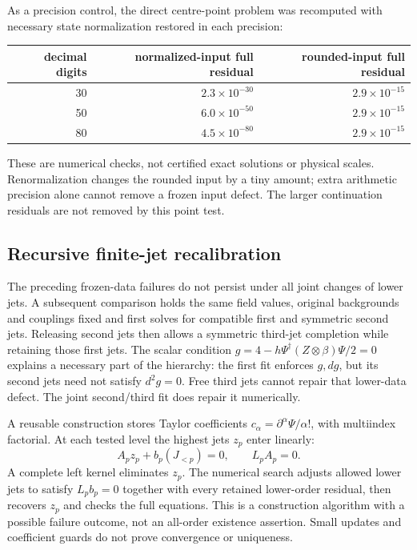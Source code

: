 As a precision control, the direct centre-point problem was recomputed
with necessary state normalization restored in each precision:
\begin{center}
\begin{tabular}{@{}rrr@{}}\toprule
decimal digits & normalized-input full residual & rounded-input full residual\\
\midrule
30 & \(2.3\times10^{-30}\) & \(2.9\times10^{-15}\)\\
50 & \(6.0\times10^{-50}\) & \(2.9\times10^{-15}\)\\
80 & \(4.5\times10^{-80}\) & \(2.9\times10^{-15}\)\\
\bottomrule\end{tabular}
\end{center}
These are numerical checks, not certified exact solutions or physical
scales. Renormalization changes the rounded input by a tiny amount;
extra arithmetic precision alone cannot remove a frozen input defect.
The larger continuation residuals are not removed by this point test.


\subsection{Recursive finite-jet recalibration}
\label{subsec:v410-recursive-calibration}

The preceding frozen-data failures do not persist under all joint
changes of lower jets. A subsequent comparison holds the same field
values, original backgrounds and couplings fixed and first solves for
compatible first and symmetric second jets. Releasing second jets then
allows a symmetric third-jet completion while retaining those first
jets. The scalar condition
\(g=4-h\Psi^\dagger(Z\otimes\beta)\Psi/2=0\) explains a necessary
part of the hierarchy: the first fit enforces \(g,dg\), but its second
jets need not satisfy \(d^2g=0\). Free third jets cannot repair that
lower-data defect. The joint second/third fit does repair it numerically.

A reusable construction stores Taylor coefficients
\(c_\alpha=\partial^\alpha\Psi/\alpha!\), with multiindex factorial.
At each tested level the highest jets \(z_p\) enter linearly:
\[
 A_p z_p+b_p(J_{<p})=0,\qquad L_p A_p=0.
\]
A complete left kernel eliminates \(z_p\). The numerical search adjusts
allowed lower jets to satisfy \(L_p b_p=0\) together with every retained
lower-order residual, then recovers \(z_p\) and checks the full equations.
This is a construction algorithm with a possible failure outcome, not
an all-order existence assertion. Small updates and coefficient guards
do not prove convergence or uniqueness.

